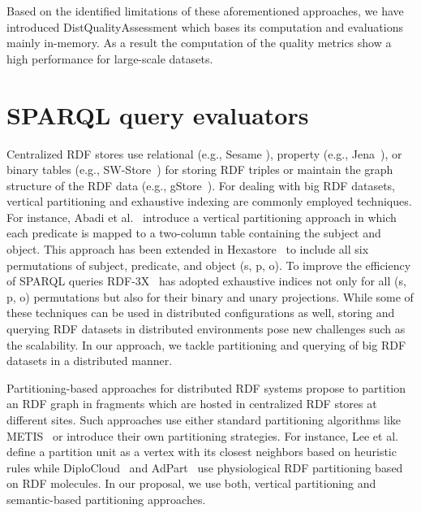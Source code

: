 Based on the identified limitations of these aforementioned approaches, we have introduced DistQualityAssessment which bases its computation and evaluations mainly in-memory.
As a result the computation of the quality metrics show a high performance for large-scale datasets.

\section{SPARQL query evaluators}

Centralized \gls{RDF} stores use relational (e.g., Sesame \cite{BroekstraKH02}), property (e.g., Jena~\cite{Wilkinson06}), or binary tables (e.g., SW-Store~\cite{AbadiMMH09}) for storing \gls{RDF} triples or maintain the graph structure of the \gls{RDF} data (e.g., gStore~\cite{ZouMCOZ11}). 
For dealing with big \gls{RDF} datasets, vertical partitioning and exhaustive indexing are commonly employed techniques. 
For instance, Abadi et al.~\cite{AbadiMMH07} introduce a vertical partitioning approach in which each predicate is mapped to a two-column table containing the subject and object. 
This approach has been extended in Hexastore~\cite{WeissKB08} to include all six permutations of subject, predicate, and object (s, p, o). 
To improve the efficiency of \gls{SPARQL} queries RDF-3X~\cite{NeumannW10} has adopted exhaustive indices not only for all (s, p, o) permutations but also for their binary and unary projections. 
While some of these techniques can be used in distributed configurations as well, storing and querying \gls{RDF} datasets in distributed environments pose new challenges such as the scalability. 
In our approach, we tackle partitioning and querying of big \gls{RDF} datasets in a distributed manner.

Partitioning-based approaches for distributed \gls{RDF} systems propose to partition an \gls{RDF} graph in fragments which are hosted in centralized \gls{RDF} stores at different sites. 
Such approaches use either standard partitioning algorithms like METIS~\cite{GurajadaSMT14} or introduce their own partitioning strategies. 
For instance, Lee et al.~\cite{LeeL2013} define a partition unit as a vertex with its closest neighbors based on heuristic rules while DiploCloud~\cite{WylotC16} and AdPart~\cite{harbi2016accelerating} use physiological \gls{RDF} partitioning based on \gls{RDF} molecules. 
In our proposal, we use both, vertical partitioning and semantic-based partitioning approaches.

